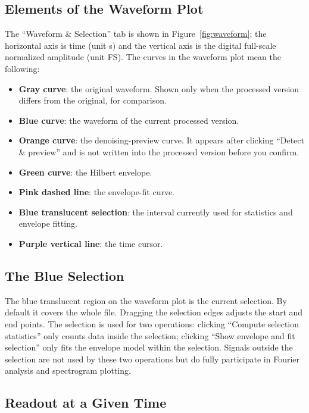 \documentclass[UTF8,a4paper,12pt]{ctexart}
\begin{document}
\subsection{Elements of the Waveform Plot}

The ``Waveform \& Selection'' tab is shown in Figure~\ref{fig:waveform}; the horizontal axis is time (unit s) and the vertical axis is the digital full-scale normalized amplitude (unit FS). The curves in the waveform plot mean the following:

\begin{itemize}
  \item \textbf{Gray curve}: the original waveform. Shown only when the processed version differs from the original, for comparison.
  \item \textbf{Blue curve}: the waveform of the current processed version.
  \item \textbf{Orange curve}: the denoising-preview curve. It appears after clicking ``Detect \& preview'' and is not written into the processed version before you confirm.
  \item \textbf{Green curve}: the Hilbert envelope.
  \item \textbf{Pink dashed line}: the envelope-fit curve.
  \item \textbf{Blue translucent selection}: the interval currently used for statistics and envelope fitting.
  \item \textbf{Purple vertical line}: the time cursor.
\end{itemize}

\subsection{The Blue Selection}

The blue translucent region on the waveform plot is the current selection. By default it covers the whole file. Dragging the selection edges adjusts the start and end points. The selection is used for two operations: clicking ``Compute selection statistics'' only counts data inside the selection; clicking ``Show envelope and fit selection'' only fits the envelope model within the selection. Signals outside the selection are not used by these two operations but do fully participate in Fourier analysis and spectrogram plotting.

\subsection{Readout at a Given Time}
\end{document}
